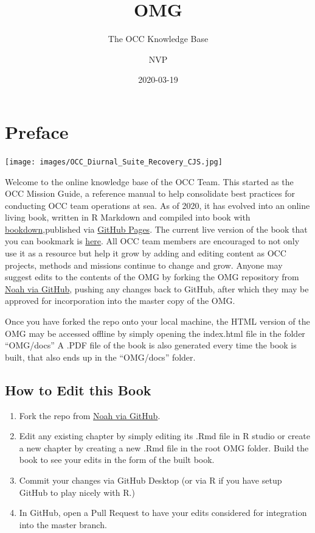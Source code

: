 \documentclass[]{book}
\title{OMG}
\subtitle{The OCC Knowledge Base}
\author{NVP}
\date{2020-03-19}
\providecommand{\tightlist}{%
  \setlength{\itemsep}{0pt}\setlength{\parskip}{0pt}}
\begin{document}
\maketitle

{
\setcounter{tocdepth}{1}
\tableofcontents
}
\hypertarget{preface}{%
\chapter*{Preface}\label{preface}}

\texttt{[image: images/OCC\_Diurnal\_Suite\_Recovery\_CJS.jpg]}

Welcome to the online knowledge base of the OCC Team. This started as the OCC Mission Guide, a reference manual to help consolidate best practices for conducting OCC team operations at sea. As of 2020, it has evolved into an online living book, written in R Markdown and compiled into book with \href{https://bookdown.org/yihui/bookdown/}{bookdown},published via \href{https://pages.github.com/}{GitHub Pages}. The current live version of the book that you can bookmark is \href{https://npomeroy.github.io/OMG/}{here}. All OCC team members are encouraged to not only use it as a resource but help it grow by adding and editing content as OCC projects, methods and missions continue to change and grow. Anyone may suggest edits to the contents of the OMG by forking the OMG repository from \href{https://github.com/npomeroy/OMG}{Noah via GitHub}, pushing any changes back to GitHub, after which they may be approved for incorporation into the master copy of the OMG.

Once you have forked the repo onto your local machine, the HTML version of the OMG may be accessed offline by simply opening the index.html file in the folder ``OMG/docs'' A .PDF file of the book is also generated every time the book is built, that also ends up in the ``OMG/docs'' folder.

\hypertarget{how-to-edit-this-book}{%
\section*{How to Edit this Book}\label{how-to-edit-this-book}}

\begin{enumerate}
\def\labelenumi{\arabic{enumi}.}
\tightlist
\item
  Fork the repo from \href{https://github.com/npomeroy/OMG}{Noah via GitHub}.
\item
  Edit any existing chapter by simply editing its .Rmd file in R studio or create a new chapter by creating a new .Rmd file in the root OMG folder. Build the book to see your edits in the form of the built book.
\item
  Commit your changes via GitHub Desktop (or via R if you have setup GitHub to play nicely with R.)
\item
  In GitHub, open a Pull Request to have your edits considered for integration into the master branch.
\end{enumerate}
\end{document}
